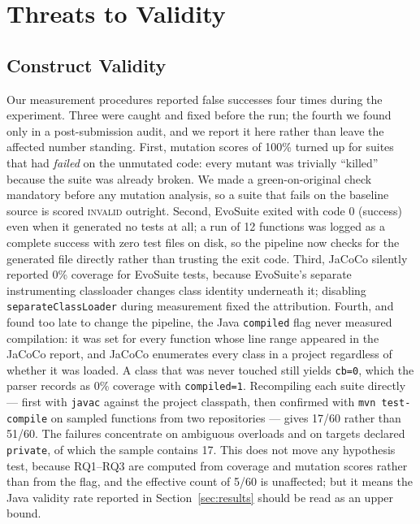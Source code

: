\section{Threats to Validity}\label{sec:threats}

\subsection{Construct Validity}
Our measurement procedures reported false successes four times during the experiment.
Three were caught and fixed before the run; the fourth we found only in a post-submission
audit, and we report it here rather than leave the affected number standing. First, mutation scores of 100\% turned up for suites
that had \emph{failed} on the unmutated code: every mutant was trivially ``killed''
because the suite was already broken. We made a green-on-original check mandatory before
any mutation analysis, so a suite that fails on the baseline source is scored
\textsc{invalid} outright. Second, EvoSuite exited with code 0 (success) even when it
generated no tests at all; a run of 12 functions was logged as a complete success with
zero test files on disk, so the pipeline now checks for the generated file directly rather
than trusting the exit code. Third, JaCoCo silently reported 0\% coverage for EvoSuite
tests, because EvoSuite's separate instrumenting classloader changes class identity
underneath it; disabling \texttt{separateClassLoader} during measurement fixed the
attribution. Fourth, and found too late to change the pipeline, the Java
\texttt{compiled} flag never measured compilation: it was set for every function whose
line range appeared in the JaCoCo report, and JaCoCo enumerates every class in a project
regardless of whether it was loaded. A class that was never touched still yields
\texttt{cb=0}, which the parser records as 0\% coverage with \texttt{compiled=1}.
Recompiling each suite directly --- first with \texttt{javac} against the project
classpath, then confirmed with \texttt{mvn test-compile} on sampled functions from two
repositories --- gives 17/60 rather than 51/60. The failures concentrate on ambiguous
overloads and on targets declared \texttt{private}, of which the sample contains 17. This
does not move any hypothesis test, because RQ1--RQ3 are computed from coverage and
mutation scores rather than from the flag, and the effective count of 5/60 is unaffected;
but it means the Java validity rate reported in Section~\ref{sec:results} should be read
as an upper bound.

